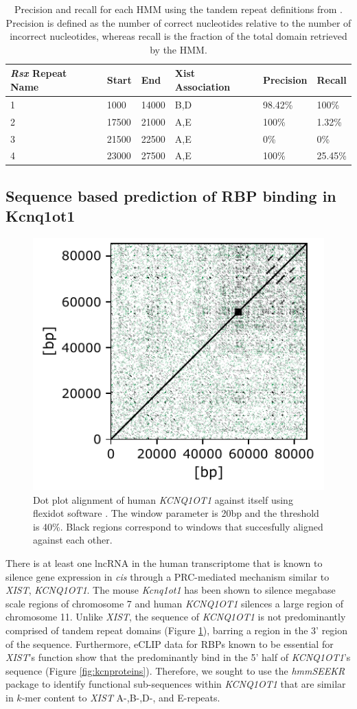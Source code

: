 \begin{table}[h!]
\centering
\begin{tabular}{|l|l|l|l|l|l|}
\hline 
\emph{Rsx} Repeat Name& Start & End   & Xist Association   & Precision& Recall                      \\
\hline 
    1&  1000   & 14000    & B,D     & 98.42\% & 100\% \\
      2&17500 & 21000  & A,E     & 100\%   & 1.32\% \\
      3&21500  & 22500   & A,E      & 0\% & 0\%  \\
      4&23000 & 27500  & A,E     & 100\%   & 25.45\% \\
\hline 
\end{tabular}
\caption{Precision and recall for each HMM using the tandem repeat definitions from \cite{Sprague2019NonlinearDomains}. Precision is defined as the number of correct nucleotides relative to the number of incorrect nucleotides, whereas recall is the fraction of the total domain retrieved by the HMM.}
\label{tbl:rsxresults}
\end{table}


\subsection{Sequence based prediction of RBP binding in Kcnq1ot1}

\begin{figure}[h!]
\centering
\includegraphics[width=.4\textwidth]{images/kcnd.pdf}
\caption[\emph{KCNQ1OT1} dot plot alignment]{Dot plot alignment of human \emph{KCNQ1OT1} against itself using flexidot software \cite{Flexidot}. The window parameter is 20bp and the threshold is 40\%. Black regions correspond to windows that succesfully aligned against each other. }
\label{fig:kcndot}
\end{figure}

There is at least one lncRNA in the human transcriptome that is known to silence gene expression in \emph{cis} through a PRC-mediated mechanism similar to \emph{XIST}, \emph{KCNQ1OT1}. The mouse \emph{Kcnq1ot1} has been shown to silence megabase scale regions of chromosome 7 and human \emph{KCNQ1OT1} silences a large region of chromosome 11. Unlike \emph{XIST}, the sequence of \emph{KCNQ1OT1} is not predominantly comprised of tandem repeat domains (Figure \ref{fig:kcndot}), barring a region in the 3' region of the sequence. Furthermore, eCLIP data for RBPs known to be essential for \emph{XIST}'s function show that the predominantly bind in the 5' half of \emph{KCNQ1OT1}'s sequence (Figure \ref{fig:kcnproteins}). Therefore, we sought to use the \emph{hmmSEEKR} package to identify functional sub-sequences within \emph{KCNQ1OT1} that are similar in $k$-mer content to \emph{XIST} A-,B-,D-, and E-repeats. 


